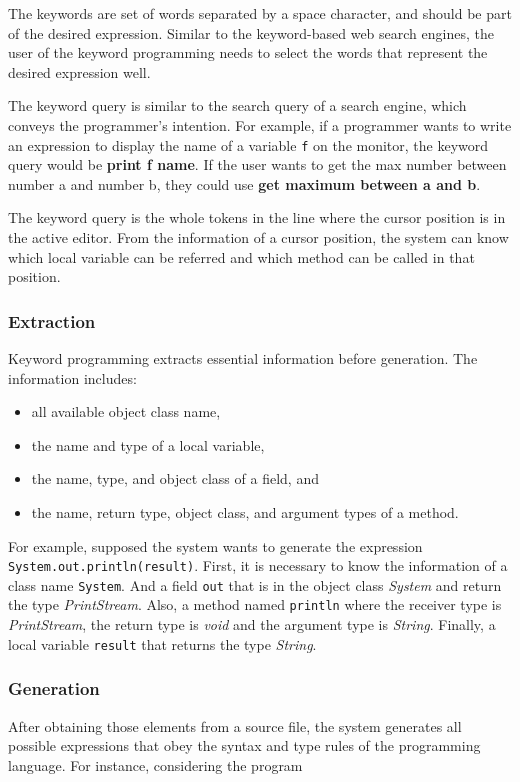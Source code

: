 \documentclass[PRO,english]{ipsj}
\begin{document}
The keywords are set of words separated by a space character, and should be part of the desired expression.  Similar to the keyword-based web search engines, the user of the keyword programming needs to select the words that represent the desired expression well.


The keyword query is similar to the search query of a search engine, which conveys the programmer’s intention. For example, if a programmer wants to write an expression to display the name of a variable \texttt{f} on the monitor, the keyword query would be \textbf{print f name}. If the user wants to get the max number between number a and number b, they could use \textbf{get maximum between a and b}.

The keyword query is the whole tokens in the line where the cursor position is in the active editor. From the information of a cursor position, the system can know which local variable can be referred and which method can be called in that position.

\subsubsection{Extraction}
Keyword programming extracts essential information before generation. The information includes:
\begin{itemize}
\item all available object class name,
\item the name and type of a local variable,
\item the name, type, and object class of a field, and
\item the name, return type, object class, and argument types of a method.
\end{itemize}

For example, supposed the system wants to generate the expression \texttt{System.out.println(result)}. First, it is necessary to know the information of a class name \texttt{System}. And a field \texttt{out} that is in the object class \textit{System} and return the type \textit{PrintStream}. Also, a method named \texttt{println} where the receiver type is \textit{PrintStream}, the return type is \textit{void} and the argument type is \textit{String}. Finally, a local variable \texttt{result} that returns the type \textit{String}.

\subsubsection{Generation}
After obtaining those elements from a source file, the system generates all possible expressions that obey the syntax and type rules of the programming language. For instance, considering the program
\end{document}
